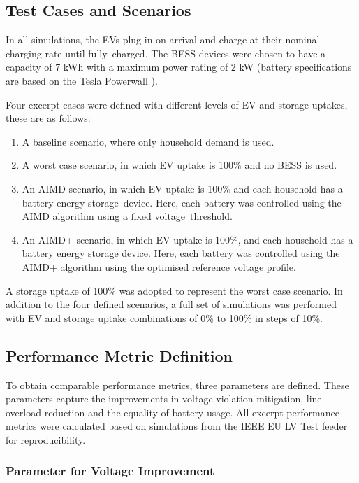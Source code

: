 \subsection{Test Cases and Scenarios}
\label{ch1:subsec:test-cases-and-scenarios}

In all simulations, the EVs plug-in on arrival and charge at their nominal charging rate until fully~charged. The BESS devices were chosen to have a capacity of 7 kWh with a maximum power rating of 2 kW (battery specifications are based on the Tesla Powerwall \cite{Powerwall2015}).

Four excerpt cases were defined with different levels of EV and storage uptakes, these are as follows:
\begin{enumerate}[label=\textbf{\Alph*}, leftmargin=2.2em, labelsep=5.5mm]
\item A baseline scenario, where only household demand is used.
\item A worst case scenario, in which EV uptake is 100\% and no BESS is used.
\item An AIMD scenario, in which EV uptake is 100\% and each household has a battery energy storage~device. Here, each battery was controlled using the AIMD algorithm using a fixed voltage~threshold.
\item An AIMD+ scenario, in which EV uptake is 100\%, and each household has a battery energy storage device. Here, each battery was controlled using the AIMD+ algorithm using the optimised reference voltage profile.
\end{enumerate}

A storage uptake of 100\% was adopted to represent the worst case scenario. In addition to the four defined scenarios, a full set of simulations was performed with EV and storage uptake combinations of 0\% to 100\% in steps of 10\%.

\subsection{Performance Metric Definition}
\label{ch1:subsec:performance-metric-definition}

To obtain comparable performance metrics, three parameters are defined. These parameters capture the improvements in voltage violation mitigation, line overload reduction and the equality of battery usage. All excerpt performance metrics were calculated based on simulations from the IEEE EU LV Test feeder for reproducibility.

\subsubsection{Parameter for Voltage Improvement}


